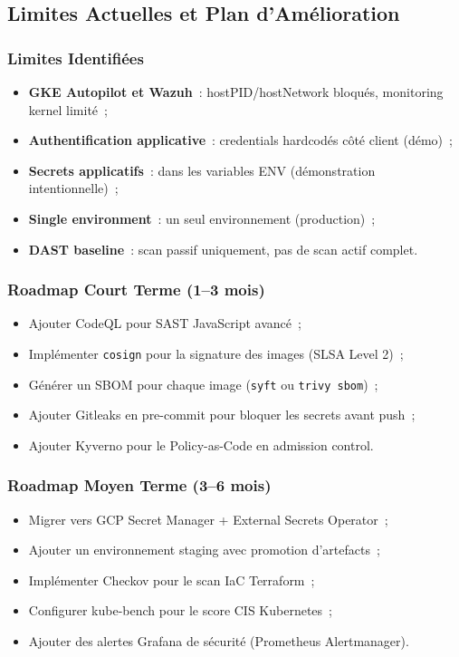 \subsection{Limites Actuelles et Plan d'Amélioration}

\subsubsection{Limites Identifiées}
\begin{itemize}
  \item \textbf{GKE Autopilot et Wazuh}~: hostPID/hostNetwork bloqués, monitoring kernel limité~;
  \item \textbf{Authentification applicative}~: credentials hardcodés côté client (démo)~;
  \item \textbf{Secrets applicatifs}~: dans les variables ENV (démonstration intentionnelle)~;
  \item \textbf{Single environment}~: un seul environnement (production)~;
  \item \textbf{DAST baseline}~: scan passif uniquement, pas de scan actif complet.
\end{itemize}

\subsubsection{Roadmap Court Terme (1--3 mois)}
\begin{itemize}
  \item Ajouter CodeQL pour SAST JavaScript avancé~;
  \item Implémenter \texttt{cosign} pour la signature des images (SLSA Level 2)~;
  \item Générer un SBOM pour chaque image (\texttt{syft} ou \texttt{trivy sbom})~;
  \item Ajouter Gitleaks en pre-commit pour bloquer les secrets avant push~;
  \item Ajouter Kyverno pour le Policy-as-Code en admission control.
\end{itemize}

\subsubsection{Roadmap Moyen Terme (3--6 mois)}
\begin{itemize}
  \item Migrer vers GCP Secret Manager + External Secrets Operator~;
  \item Ajouter un environnement staging avec promotion d'artefacts~;
  \item Implémenter Checkov pour le scan IaC Terraform~;
  \item Configurer kube-bench pour le score CIS Kubernetes~;
  \item Ajouter des alertes Grafana de sécurité (Prometheus Alertmanager).
\end{itemize}


